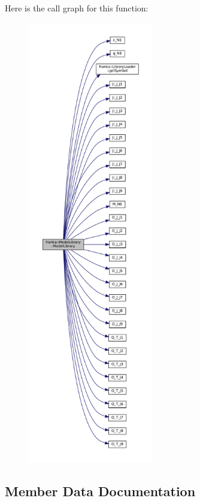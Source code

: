 Here is the call graph for this function\+:
\nopagebreak
\begin{figure}[H]
\begin{center}
\leavevmode
\includegraphics[height=550pt]{classfranka_1_1ModelLibrary_a3f15c2a63dc31a7312ac37a106d18dcf_cgraph}
\end{center}
\end{figure}


\subsection{Member Data Documentation}
\mbox{\label{classfranka_1_1ModelLibrary_a0e3a34c07df598e22fd50d4f764f5786}} 
